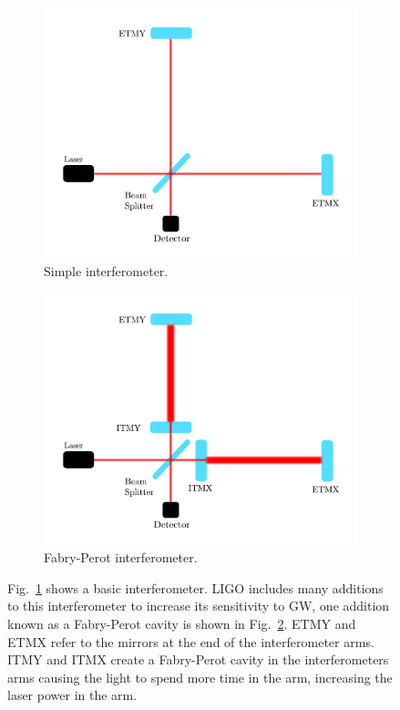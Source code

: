 \begin{figure}[hp]
    \centering
    \begin{subfigure}[h]{0.6\linewidth}
    	 \includegraphics[width=\textwidth]{C1_intro/interferometer.pdf}
    	 \caption{Simple interferometer.}
    	 \label{detectors:interferometer:simple}
    \end{subfigure}
	\begin{subfigure}[h]{0.6\linewidth}
		\includegraphics[width=\textwidth]{C1_intro/interferometer_fabry.pdf}
		\caption{Fabry-Perot interferometer.}
		\label{detectors:interferometer:fabry}
	\end{subfigure}
    \caption[Basic layout of the \gls{LIGO}
detectors.]{Fig.~\ref{detectors:interferometer:simple} shows a basic
interferometer. \gls{LIGO} includes many additions to this interferometer to
increase its sensitivity to \gls{GW}, one addition known as a Fabry-Perot
cavity is shown in Fig.~\ref{detectors:interferometer:fabry}. \Gls{ETMY} and
\gls{ETMX} refer to the mirrors at the end of the interferometer arms.  \Gls{ITMY} and \gls{ITMX} create a Fabry-Perot cavity in the interferometers
arms causing the light to spend more time in the arm, increasing the laser power in the arm.}
\label{detectors:interferometer}
\end{figure}

